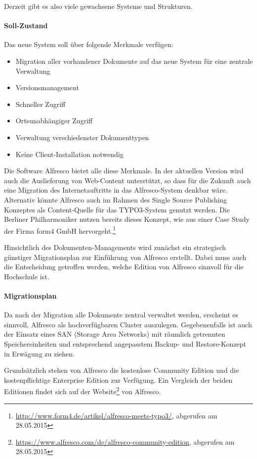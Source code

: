 Derzeit gibt es also viele gewachsene Systeme und Strukturen.

\paragraph{Soll-Zustand}
Das neue System soll über folgende Merkmale verfügen:
\begin{itemize}
	\item Migration aller vorhandener Dokumente auf das neue System für eine zentrale Verwaltung
	\item Versionsmanagement
	\item Schneller Zugriff
	\item Ortsunabhängiger Zugriff
	\item Verwaltung verschiedenster Dokumenttypen
	\item Keine Client-Installation notwendig
\end{itemize}

Die Software Alfresco bietet alle diese Merkmale. In der aktuellen Version wird auch die Auslieferung von Web-Content unterstützt, so dass für die Zukunft auch eine Migration des Internetauftritts in das Alfresco-System denkbar wäre. Alternativ könnte Alfresco auch im Rahmen des Single Source Publishing Konzeptes als Content-Quelle für das TYPO3-System genutzt werden. Die Berliner Philharmoniker nutzen bereits dieses Konzept, wie aus einer Case Study der Firma form4 GmbH hervorgeht.\footnote{\url{http://www.form4.de/artikel/alfresco-meets-typo3/}, abgerufen am 28.05.2015}

Hinsichtlich des Dokumenten-Managements wird zunächst ein strategisch günstiger Migrationsplan zur Einführung von Alfresco erstellt. Dabei muss auch die Entscheidung getroffen werden, welche Edition von Alfresco sinnvoll für die Hochschule ist.

\paragraph{Migrationsplan}
Da nach der Migration alle Dokumente zentral verwaltet werden, erscheint es sinnvoll, Alfresco als hochverfügbaren Cluster auszulegen. Gegebenenfalls ist auch der Einsatz eines SAN (Storage Area Networks) mit räumlich getrennten Speichereinheiten und entsprechend angepasstem Backup- und Restore-Konzept in Erwägung zu ziehen.

Grundsätzlich stehen von Alfresco die kostenlose Community Edition und die kostenpflichtige Enterprise Edition zur Verfügung. Ein Vergleich der beiden Editionen findet sich auf der Website\footnote{\url{https://www.alfresco.com/de/alfresco-community-edition}, abgerufen am 28.05.2015} von Alfresco.

